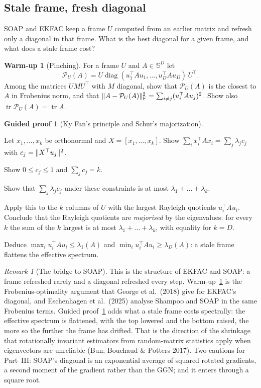 \documentclass[11pt,a4paper]{article}
\newcommand{\Sym}{\mathbb{S}}
\DeclareMathOperator{\tr}{tr}
\DeclareMathOperator{\diag}{diag}
\DeclarePairedDelimiter{\norm}{\lVert}{\rVert}
\newcommand{\F}{\mathrm{F}}
\theoremstyle{plain}
\theoremstyle{definition}
\newtheorem{warmup}[proposition]{Warm-up}
\newtheorem{guided}[proposition]{Guided proof}
\theoremstyle{remark}
\newtheorem{remark}[proposition]{Remark}
\begin{document}
\subsection{Stale frame, fresh diagonal}

SOAP and EKFAC keep a frame $U$ computed from an earlier matrix and refresh only a diagonal in that frame. What is
the best diagonal for a given frame, and what does a stale frame cost?

\begin{warmup}[Pinching]\label{wu:pinching}
For a frame $U$ and $A\in\Sym^D$ let
\[\mathcal{P}_U(A)=U\diag(u_1^\top Au_1,\dots,u_D^\top Au_D)\,U^\top.\]
Among the matrices $UMU^\top$ with $M$ diagonal, show that $\mathcal{P}_U(A)$ is the closest to $A$ in Frobenius
norm, and that $\norm{A-\mathcal{P}_U(A)}_\F^2=\sum_{i\ne j}(u_i^\top Au_j)^2$. Show also $\tr\mathcal{P}_U(A)=\tr A$.
\end{warmup}

\begin{guided}[Ky Fan's principle and Schur's majorization]\label{gp:kyfan}
\begin{steps}
\item Let $x_1,\dots,x_k$ be orthonormal and $X=[x_1,\dots,x_k]$. Show $\sum_ix_i^\top Ax_i=\sum_j\lambda_jc_j$ with
  $c_j=\norm{X^\top u_j}^2$.
\item Show $0\le c_j\le1$ and $\sum_jc_j=k$.
\item Show that $\sum_j\lambda_jc_j$ under these constraints is at most $\lambda_1+\dots+\lambda_k$.
\item Apply this to the $k$ columns of $U$ with the largest Rayleigh quotients $u_i^\top Au_i$. Conclude that the
  Rayleigh quotients are \emph{majorised} by the eigenvalues: for every $k$ the sum of the $k$ largest is at most
  $\lambda_1+\dots+\lambda_k$, with equality for $k=D$.
\item Deduce $\max_iu_i^\top Au_i\le\lambda_1(A)$ and $\min_iu_i^\top Au_i\ge\lambda_D(A)$: a stale frame flattens
  the effective spectrum.
\end{steps}
\end{guided}

\begin{remark}[The bridge to SOAP]\label{rem:soap}
This is the structure of EKFAC and SOAP: a frame refreshed rarely and a diagonal refreshed every step.
Warm-up~\ref{wu:pinching} is the Frobenius-optimality argument that George et al.\ (2018) give for EKFAC's diagonal,
and Eschenhagen et al.\ (2025) analyse Shampoo and SOAP in the same Frobenius terms. Guided proof~\ref{gp:kyfan} adds
what a stale frame costs spectrally: the effective spectrum is flattened, with the top lowered and the bottom raised,
the more so the further the frame has drifted. That is the direction of the shrinkage that rotationally invariant
estimators from random-matrix statistics apply when eigenvectors are unreliable (Bun, Bouchaud \& Potters 2017). Two
cautions for Part~III: SOAP's diagonal is an exponential average of squared rotated gradients, a second moment of the
gradient rather than the GGN; and it enters through a square root.
\end{remark}
\end{document}

